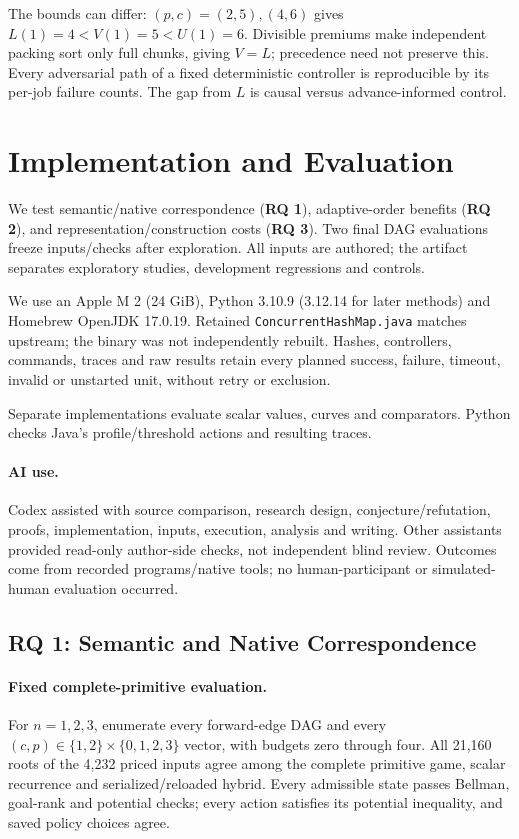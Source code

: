 \documentclass[acmsmall,screen,review,anonymous]{acmart}
\begin{document}
The bounds can differ: $(p,c)=(2,5),(4,6)$ gives $L(1)=4<V(1)=5<U(1)=6$. Divisible premiums make independent packing sort only full chunks, giving $V=L$; precedence need not preserve this. Every adversarial path of a fixed deterministic controller is reproducible by its per-job failure counts. The gap from $L$ is causal versus advance-informed control.

\section{Implementation and Evaluation}
\label{sec:eval}

We test semantic/native correspondence (\textbf{RQ 1}), adaptive-order benefits (\textbf{RQ 2}), and representation/construction costs (\textbf{RQ 3}). Two final DAG evaluations freeze inputs/checks after exploration. All inputs are authored; the artifact separates exploratory studies, development regressions and controls.

We use an Apple M 2 (24 GiB), Python 3.10.9 (3.12.14 for later methods) and Homebrew OpenJDK 17.0.19. Retained \texttt{ConcurrentHashMap.java} matches upstream; the binary was not independently rebuilt. Hashes, controllers, commands, traces and raw results retain every planned success, failure, timeout, invalid or unstarted unit, without retry or exclusion.

Separate implementations evaluate scalar values, curves and comparators. Python checks Java's profile/threshold actions and resulting traces.

\paragraph{AI use.}
Codex assisted with source comparison, research design, conjecture/refutation, proofs, implementation, inputs, execution, analysis and writing. Other assistants provided read-only author-side checks, not independent blind review. Outcomes come from recorded programs/native tools; no human-participant or simulated-human evaluation occurred.

\subsection{RQ 1: Semantic and Native Correspondence}

\paragraph{Fixed complete-primitive evaluation.}
For $n=1,2,3$, enumerate every forward-edge DAG and every $(c,p)\in\{1,2\}\times\{0,1,2,3\}$ vector, with budgets zero through four. All 21,160 roots of the 4,232 priced inputs agree among the complete primitive game, scalar recurrence and serialized/reloaded hybrid. Every admissible state passes Bellman, goal-rank and potential checks; every action satisfies its potential inequality, and saved policy choices agree.
\end{document}
